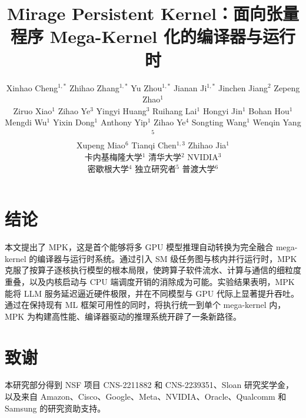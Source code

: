 \documentclass[letterpaper,twocolumn,10pt]{article}
\theoremstyle{definition}
\renewcommand{\thefootnote}{\arabic{footnote}}
\newcommand{\sys}{MPK\xspace}
\newcommand{\sys}{TGX\xspace}
\begin{document}
\title{Mirage Persistent Kernel：面向张量程序 Mega-Kernel 化的编译器与运行时}
\author{
\rm{Xinhao Cheng}$^{1,*}$ \quad
\rm{Zhihao Zhang}$^{1,*}$ \quad
\rm{Yu Zhou}$^{1,*}$ \quad
\rm{Jianan Ji}$^{1,*}$ \quad
\rm{Jinchen Jiang}$^{2}$ \quad
\rm{Zepeng Zhao}$^{1}$ \\
\rm{Ziruo Xiao}$^{1}$ \quad
\rm{Zihao Ye}$^{3}$ \quad
\rm{Yingyi Huang}$^{3}$ \quad
\rm{Ruihang Lai}$^{1}$ \quad
\rm{Hongyi Jin}$^{1}$ \quad
\rm{Bohan Hou}$^{1}$ \\
\rm{Mengdi Wu}$^{1}$ \quad
\rm{Yixin Dong}$^{1}$ \quad
\rm{Anthony Yip}$^{1}$ \quad
\rm{Zihao Ye}$^{4}$ \quad
\rm{Songting Wang}$^{1}$ \quad
\rm{Wenqin Yang}$^{5}$ \\
\rm{Xupeng Miao}$^{6}$ \quad
\rm{Tianqi Chen}$^{1,3}$ \quad
\rm{Zhihao Jia}$^{1}$
\\[1em]
卡内基梅隆大学$^{1}$ \quad
清华大学$^{2}$ \quad
NVIDIA$^{3}$ \\
密歇根大学$^{4}$ \quad
独立研究者$^{5}$ \quad
普渡大学$^{6}$
}
\maketitle

{\let\thefootnote\relax{}}

\renewcommand{\paragraph}[1]{{\vspace{.2em}\noindent\textbf{#1}~~}}










\section{结论}
\label{sec:conclusion}

本文提出了 \sys，这是首个能够将多 GPU 模型推理自动转换为完全融合 mega-kernel 的编译器与运行时系统。通过引入 SM 级任务图与核内并行运行时，\sys 克服了按算子逐核执行模型的根本局限，使跨算子软件流水、计算与通信的细粒度重叠，以及内核启动与 CPU 端调度开销的消除成为可能。实验结果表明，\sys 能将 LLM 服务延迟逼近硬件极限，并在不同模型与 GPU 代际上显著提升吞吐。通过在保持现有 ML 框架可用性的同时，将执行统一到单个 mega-kernel 内，\sys 为构建高性能、编译器驱动的推理系统开辟了一条新路径。

\section*{致谢}
本研究部分得到 NSF 项目 CNS-2211882 和 CNS-2239351、Sloan 研究奖学金，以及来自 Amazon、Cisco、Google、Meta、NVIDIA、Oracle、Qualcomm 和 Samsung 的研究资助支持。

\balance


\end{document}
